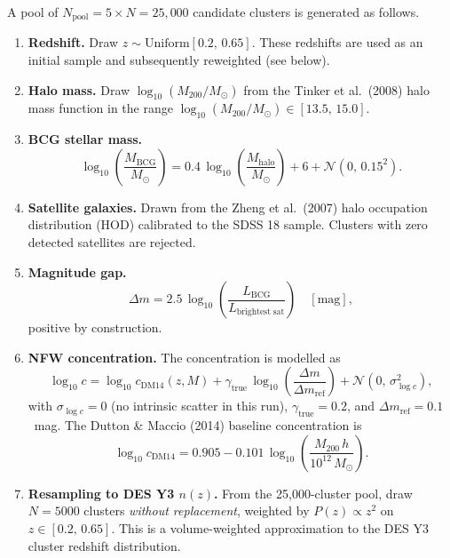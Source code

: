 \documentclass[11pt,a4paper]{article}
\begin{document}
A pool of $N_\mathrm{pool} = 5 \times N = 25{,}000$ candidate clusters is generated
as follows.

\begin{enumerate}
  \item \textbf{Redshift.}  Draw $z \sim \mathrm{Uniform}[0.2,\,0.65]$.
        These redshifts are used as an initial sample and subsequently reweighted
        (see below).

  \item \textbf{Halo mass.}  Draw $\log_{10}(M_{200}/M_\odot)$ from the
        Tinker et al.\ (2008) halo mass function in the range
        $\log_{10}(M_{200}/M_\odot) \in [13.5,\,15.0]$.

  \item \textbf{BCG stellar mass.}
        \begin{equation}
          \log_{10}\!\left(\frac{M_\mathrm{BCG}}{M_\odot}\right)
          = 0.4\,\log_{10}\!\left(\frac{M_\mathrm{halo}}{M_\odot}\right)
          + 6
          + \mathcal{N}(0,\,0.15^2).
        \end{equation}

  \item \textbf{Satellite galaxies.}  Drawn from the Zheng et al.\ (2007) halo
        occupation distribution (HOD) calibrated to the SDSS 18 sample.
        Clusters with zero detected satellites are rejected.

  \item \textbf{Magnitude gap.}
        \begin{equation}
          \Delta m = 2.5\,\log_{10}\!\left(\frac{L_\mathrm{BCG}}{L_\mathrm{brightest\;sat}}\right)
          \quad[\mathrm{mag}],
        \end{equation}
        positive by construction.

  \item \textbf{NFW concentration.}  The concentration is modelled as
        \begin{equation}
          \log_{10} c = \log_{10} c_\mathrm{DM14}(z,M)
          + \gamma_\mathrm{true}\,\log_{10}\!\left(\frac{\Delta m}{\Delta m_\mathrm{ref}}\right)
          + \mathcal{N}(0,\,\sigma_{\log c}^2),
        \end{equation}
        with $\sigma_{\log c} = 0$ (no intrinsic scatter in this run),
        $\gamma_\mathrm{true} = 0.2$, and $\Delta m_\mathrm{ref} = 0.1$~mag.
        The Dutton \& Maccio (2014) baseline concentration is
        \begin{equation}
          \log_{10} c_\mathrm{DM14} = 0.905
          - 0.101\,\log_{10}\!\left(\frac{M_{200}\,h}{10^{12}\,M_\odot}\right).
        \end{equation}

  \item \textbf{Resampling to DES Y3 $n(z)$.}  From the 25{,}000-cluster pool,
        draw $N = 5000$ clusters \emph{without replacement}, weighted by
        $P(z) \propto z^2$ on $z \in [0.2,\,0.65]$.  This is a volume-weighted
        approximation to the DES Y3 cluster redshift distribution.
\end{enumerate}
\end{document}
